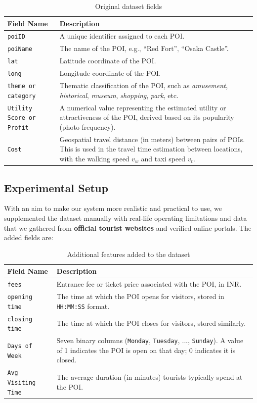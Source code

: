 \begin{table}[th]
\begin{tabularx}{0.5\textwidth}{p{3cm} X}
\hline
\textbf{Field Name} & \textbf{Description} \\
\hline
\texttt{poiID} & A unique identifier assigned to each POI. \\
\hline
\texttt{poiName} & The name of the POI, e.g., ``Red Fort'', ``Osaka Castle''. \\
\hline
\texttt{lat} & Latitude coordinate of the POI. \\
\hline
\texttt{long} & Longitude coordinate of the POI. \\
\hline
\texttt{theme or category} & Thematic classification of the POI, such as \textit{amusement}, \textit{historical}, \textit{museum}, \textit{shopping}, \textit{park}, etc. \\
\hline
\texttt{Utility Score or Profit} & A numerical value representing the estimated utility or attractiveness of the POI, derived based on its popularity (photo frequency). \\
\hline
\texttt{Cost} & Geospatial travel distance (in meters) between pairs of POIs. This is used in the travel time estimation between locations, with the walking speed $v_w$ and taxi speed $v_t$. \\
\hline
\end{tabularx}
\caption{Original dataset fields}
\end{table}

\subsection{Experimental Setup}

With an aim to make our system more realistic and practical to use, we supplemented the dataset manually with real-life operating limitations and data that we gathered from \textbf{official tourist websites} and verified online portals. The added fields are:

\begin{table}[th]
\centering
\begin{tabularx}{0.5\textwidth}{p{3cm} X}
\toprule
\textbf{Field Name} & \textbf{Description} \\
\midrule
\texttt{fees} & Entrance fee or ticket price associated with the POI, in INR. \\
\midrule
\texttt{opening time} & The time at which the POI opens for visitors, stored in \texttt{HH:MM:SS} format. \\
\midrule
\texttt{closing time} & The time at which the POI closes for visitors, stored similarly. \\
\midrule
\texttt{Days of Week} & Seven binary columns (\texttt{Monday}, \texttt{Tuesday}, ..., \texttt{Sunday}). A value of 1 indicates the POI is open on that day; 0 indicates it is closed. \\
\midrule
\texttt{Avg Visiting Time} & The average duration (in minutes) tourists typically spend at the POI. \\
\bottomrule
\end{tabularx}
\caption{Additional features added to the dataset}
\end{table}

